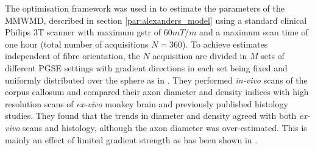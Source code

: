 The optimisation framework was used in \citet{Alexander:2010} to estimate the parameters of the \gls{MMWMD}, described in section \ref{par:alexanders_model} using a standard clinical Philips 3T scanner with maximum {\gls{gstr}} of $60mT/m$ and a maximum scan time of one hour (total number of acquisitions $N=360$). To achieve estimates independent of fibre orientation, the $N$ acquisition are divided in $M$ sets of different PGSE settings with gradient directions in each set being fixed and uniformly distributed over the sphere as in \cite{Cook:2007}. They performed \emph{in-vivo} scans of the corpus callosum and compared their axon diameter and density indices with high resolution scans of \emph{ex-vivo} monkey brain and previously published histology studies. They found that the trends in diameter and density agreed with both \emph{ex-vivo} scans and histology, although the axon diameter was over-estimated. This is mainly an effect of limited gradient strength as has been shown in \cite{Dyrby:2010}.  


